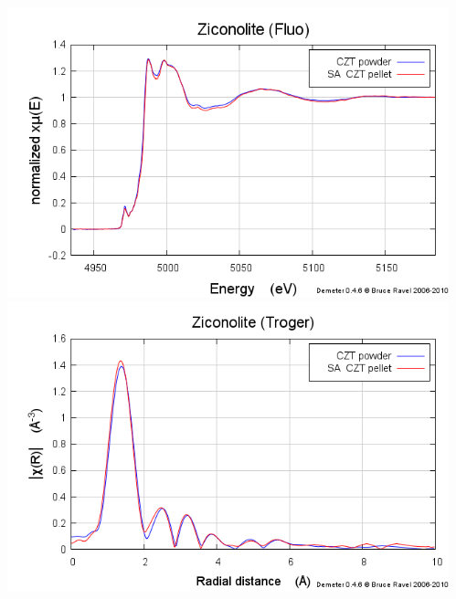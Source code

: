 \documentclass[10pt, xcolor=x11names, compress, handout]{beamer}
\begin{document}
\begin{frame}
\begin{columns}
\begin{column}{0.5\linewidth}
\begin{center}
      \end{center}
    \end{column}
    \begin{column}{0.5\linewidth}
      \begin{center}
        \includegraphics[width=0.8\linewidth]{images/zirconolite_mu.png}\\
        \includegraphics[width=0.8\linewidth]{images/zirconolite_chir.png}
      \end{center}
    \end{column}
  \end{columns}
\end{frame}
\end{document}
